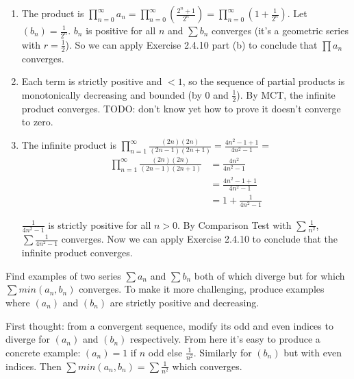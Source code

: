 \documentclass{oxmathproblems}
\begin{document}
\begin{questions}
\begin{solution}
  \begin{enumerate}[label=(\alph*)]
    \item The product is $\prod_{n=0}^{\infty} a_{n} = \prod_{n=0}^{\infty} (\frac{2^{n} + 1}{2^{n}}) = \prod_{n=0}^{\infty} (1 + \frac{1}{2^{n}})$. Let $(b_{n}) = \frac{1}{2^{n}}$. $b_{n}$ is positive for all $n$
    and $\sum b_{n}$ converges (it's a geometric series with $r=\frac{1}{2}$). So we can apply Exercise 2.4.10 part (b) to conclude that $\prod a_{n}$ converges.
  
    \item Each term is strictly positive and  $< 1$, so the sequence of partial products is monotonically decreasing and bounded (by 0 and $\frac{1}{2}$). By MCT, the infinite product
    converges. TODO: don't know yet how to prove it doesn't converge to zero.
    
    \item The infinite product is $\prod_{n=1}^{\infty} \frac{(2n)(2n)}{(2n-1)(2n+1)} = \frac{4n^{2} - 1 + 1}{4n^{2}-1} = $
    \begin{align*}
      \prod_{n=1}^{\infty} \frac{(2n)(2n)}{(2n-1)(2n+1)}
      &= \frac{4n^{2}}{4n^{2}-1} \\
      &= \frac{4n^{2}-1+1}{4n^{2}-1} \\
      &= 1 + \frac{1}{4n^{2}-1}
    \end{align*}

    $\frac{1}{4n^{2}-1}$ is strictly positive for all $n > 0$. By Comparison Test with $\sum \frac{1}{n^2}$, $\sum \frac{1}{4n^{2}-1}$ converges. Now we can apply Exercise 2.4.10 to conclude that
    the infinite product converges.
  \end{enumerate}
\end{solution}

\miquestion Find examples of two series $\sum a_{n}$ and $\sum b_{n}$ both of which diverge but for which $\sum min(a_{n}, b_{n})$ converges. To make it more challenging, produce examples
where $(a_{n})$ and $(b_{n})$ are strictly positive and decreasing.

\begin{solution}
  First thought: from a convergent sequence, modify its odd and even indices to diverge for $(a_{n})$ and $(b_{n})$ respectively. From here it's easy to produce a concrete example:
  $(a_{n}) = 1$ if $n$ odd else $\frac{1}{n^2}$. Similarly for $(b_{n})$ but with even indices. Then $\sum min(a_{n}, b_{n}) = \sum \frac{1}{n^{2}}$ which converges.


\end{solution}
\end{questions}
\end{document}
